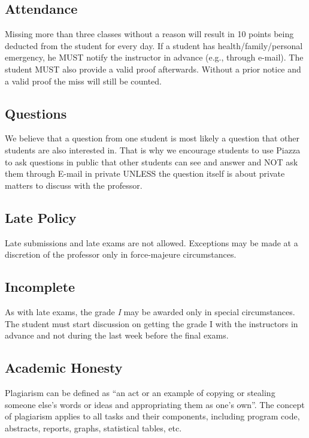 \documentclass[12pt,a4paper,oneside]{article}
\begin{document}
    \subsection{Attendance}

        Missing more than three classes without a reason will result in 10
        points being deducted from the student for every day. If a student has
        health/family/personal emergency, he MUST notify the instructor in
        advance (e.g., through e-mail). The student MUST also provide a valid
        proof afterwards. Without a prior notice and a valid proof the miss will
        still be counted.

    \subsection{Questions}

        We believe that a question from one student is most likely a question
        that other students are also interested in. That is why we encourage
        students to use Piazza to ask questions in public that other students
        can see and answer and NOT ask them through E-mail in private UNLESS the
        question itself is about private matters to discuss with the professor.

    \subsection{Late Policy}

        Late submissions and late exams are not allowed. Exceptions may be made
        at a discretion of the professor only in force-majeure circumstances.

    \subsection{Incomplete}

        As with late exams, the grade \textit{I} may be awarded only in special
        circumstances. The student must start discussion on getting the grade I
        with the instructors in advance and not during the last week before the
        final exams.

    \subsection{Academic Honesty}

        Plagiarism can be defined as “an act or an example of copying or
        stealing someone else’s words or ideas and appropriating them as one’s
        own”. The concept of plagiarism applies to all tasks and their
        components, including program code, abstracts, reports, graphs,
        statistical tables, etc.
\end{document}
